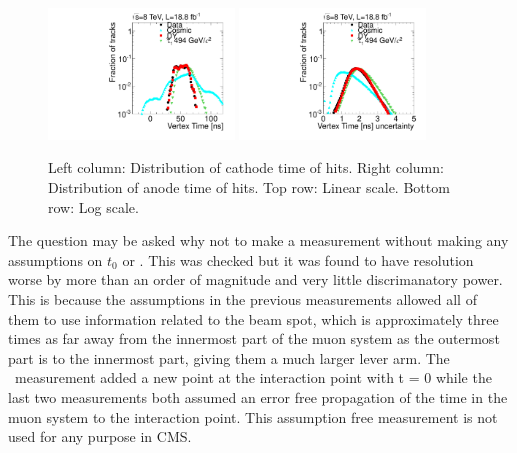 \begin{figure}
  \begin{center}
      \includegraphics[width=0.44\textwidth]{figures/timing/VertexOpp}
      \includegraphics[width=0.44\textwidth]{figures/timing/VertexOppErr} \\
      \renewcommand\baselinestretch{1}\caption[Gluino1200f100 System Pt vs MET]
      {Left column: Distribution of cathode time of hits. Right column: Distribution of anode time of hits. Top row: Linear scale. Bottom row: Log scale.
        }
      \renewcommand\baselinestretch{\@spacing}
      \label{fig:vertexopptime}
  \end{center}
\end{figure}

The question may be asked why not to make a measurement without making any assumptions on $t_0$ or \invbeta. This was checked but it was found to have
resolution worse by more than an order of magnitude and very little discrimanatory power.
This is because the assumptions in the previous measurements allowed all of them to use information
related to the beam spot, which is approximately three times as far away from the innermost part of the muon system as the outermost part is to the innermost part,
giving them a much larger lever arm.
The \invbeta\ measurement added a new point at the interaction point with t = 0 while the last
two measurements both assumed an error free propagation of the time in the muon system to the interaction point.
This assumption free measurement is not used for any purpose in CMS.


